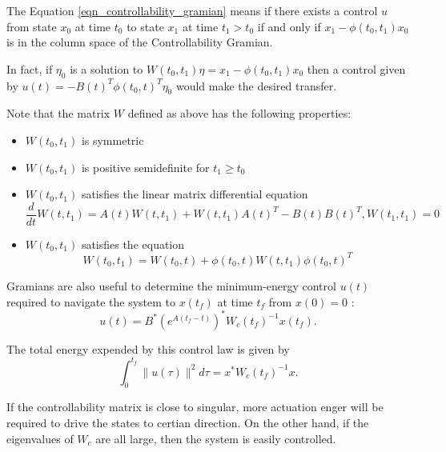 The Equation \ref{eqn_controllability_gramian} means if there exists a control $u$ from state $x_0$ at time $t_0$ to state $x_1$ at time $t_1>t_0$ if and only if $x_1-\phi\left(t_0, t_1\right) x_0$ is in the column space of the Controllability Gramian.

In fact, if $\eta_0$ is a solution to $W\left(t_0, t_1\right) \eta=x_1-\phi\left(t_0, t_1\right) x_0$ then a control given by $u(t)=-B(t)^T \phi\left(t_0, t\right)^T \eta_0$ would make the desired transfer.

Note that the matrix $W$ defined as above has the following properties:
\begin{itemize}
\item  $W\left(t_0, t_1\right)$ is symmetric
\item $W\left(t_0, t_1\right)$ is positive semidefinite for $t_1 \geq t_0$
\item $W\left(t_0, t_1\right)$ satisfies the linear matrix differential equation
\begin{equation}
\frac{d}{d t} W\left(t, t_1\right)=A(t) W\left(t, t_1\right)+W\left(t, t_1\right) A(t)^T-B(t) B(t)^T, W\left(t_1, t_1\right)=0
\end{equation}
\item $W\left(t_0, t_1\right)$ satisfies the equation \parencite{brockett2015finite}
\begin{equation}
W\left(t_0, t_1\right)=W\left(t_0, t\right)+\phi\left(t_0, t\right) W\left(t, t_1\right) \phi\left(t_0, t\right)^{T}
\end{equation}
\end{itemize}

Gramians are also useful to determine the minimum-energy control ${u}(t)$ required to navigate the system to ${x}\left(t_f\right)$ at time $t_f$ from ${x}(0)=0$ \parencite{brunton2022data}:
\begin{equation}
{u}(t)={B}^*\left(e^{{A}\left(t_f-t\right)}\right)^* {W}_c\left(t_f\right)^{-1} {x}\left(t_f\right) .
\end{equation}

The total energy expended by this control law is given by
\begin{equation}
\int_0^{t_f}\|{u}(\tau)\|^2 d \tau={x}^* {W}_c\left(t_f\right)^{-1} {x} .
\end{equation}

If the controllability matrix is close to singular, more actuation enger will be required to drive the states to certian direction. On the other hand, if the eigenvalues of ${W}_c$ are all large, then the system is easily controlled.

